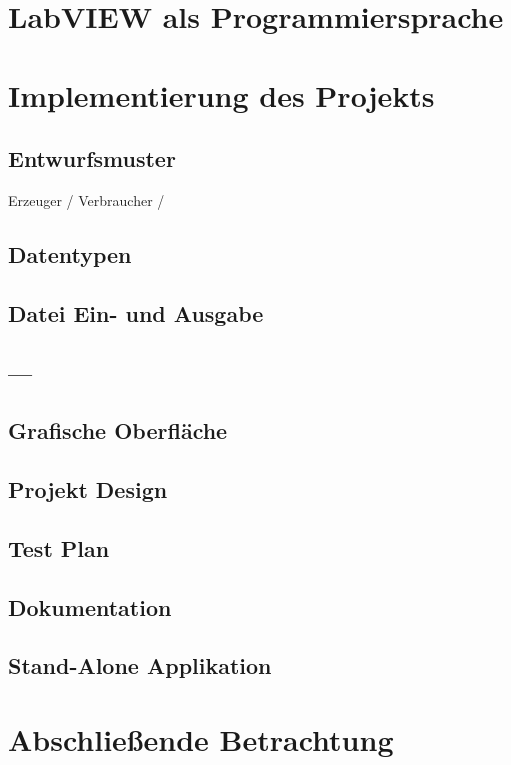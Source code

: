 \section{LabVIEW als Programmiersprache}
\label{sec:labview}



\section{Implementierung des Projekts}

\subsection{Entwurfsmuster}
Erzeuger / Verbraucher / 

\subsection{Datentypen}

\subsection{Datei Ein- und Ausgabe}

\subsection{---}



\subsection{Grafische Oberfläche}

\subsection{Projekt Design}

\subsection{Test Plan}

\subsection{Dokumentation}

\subsection{Stand-Alone Applikation}



\section{Abschließende Betrachtung}

